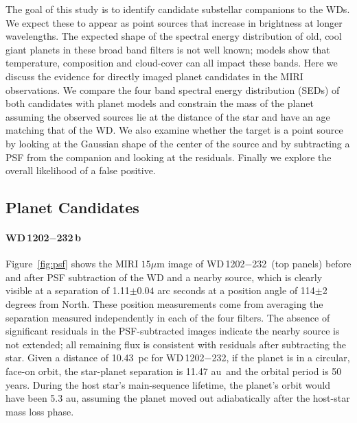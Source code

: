 \documentclass[twocolumn]{aastex631}
\newcommand{\au}{\,au}
\newcommand{\wdA}{WD\,1202$-$232}
\begin{document}
The goal of this study is to identify candidate substellar companions to the WDs. We expect these to appear as point sources that increase in brightness at longer wavelengths.  The expected shape of the spectral energy distribution of old, cool giant planets in these broad band filters is not well known; models show that temperature, composition and cloud-cover can all impact these bands.  Here we discuss the evidence for directly imaged planet candidates in the MIRI observations. We compare the four band spectral energy distribution (SEDs) of both candidates with planet models and constrain the mass of the planet assuming the observed sources lie at the distance of the star and have an age matching that of the WD. We also examine whether the target is a point source by looking at the Gaussian shape of the center of the source and by subtracting a PSF from the companion and looking at the residuals. Finally we explore the overall likelihood of a false positive.



\subsection{Planet Candidates}

\paragraph{\wdA\,b}  Figure~\ref{fig:psf} shows the MIRI $15\mu$m image of \wdA\ (top panels) before and after PSF subtraction of the WD and a nearby source, which is clearly visible at a separation of 1.11$\pm0.04$ arc seconds at a position angle of 114$\pm$2 degrees from North. These position measurements come from averaging the separation measured independently in each of the four filters. The absence of significant residuals in the PSF-subtracted images indicate the nearby source is not extended; all remaining flux is consistent with residuals after subtracting the star.
Given a distance of 10.43~pc for \wdA, if the planet is in a circular, face-on orbit, the star-planet separation is 11.47\,\au\ and the orbital period is 50 years. During the host star's main-sequence lifetime, the planet's orbit would have been 5.3\,\au, assuming the planet moved out adiabatically after the host-star mass loss phase. 
\end{document}
